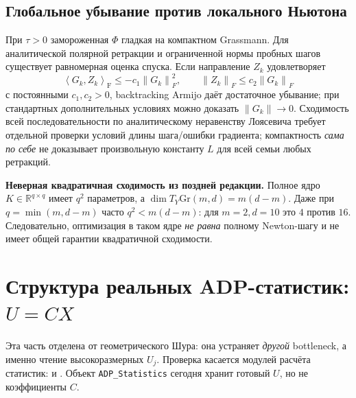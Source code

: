 \documentclass[10.5pt,a4paper]{article}
\newcommand{\R}{\mathbb{R}}
\newcommand{\Gr}{\mathrm{Gr}}
\newcommand{\norm}[1]{\left\|#1\right\|}
\newcommand{\inn}[2]{\left\langle #1,#2\right\rangle_{\mathrm F}}
\numberwithin{equation}{section}
\theoremstyle{plain}
\theoremstyle{definition}
\begin{document}
\subsection{Глобальное убывание против локального Ньютона}
При $\tau>0$ замороженная $\Phi$ гладкая на компактном Grassmann. Для аналитической полярной ретракции и ограниченной нормы пробных шагов существует равномерная оценка спуска. Если направление $Z_k$ удовлетворяет
\begin{equation}
 \inn{G_k}{Z_k}\le-c_1\norm{G_k}_F^2,
 \qquad \norm{Z_k}_F\le c_2\norm{G_k}_F
 \label{eq:gradrelated}
\end{equation}
с постоянными $c_1,c_2>0$, backtracking Armijo даёт достаточное убывание; при стандартных дополнительных условиях можно доказать $\norm{G_k}\to0$. Сходимость всей последовательности по аналитическому неравенству Лоясевича требует отдельной проверки условий длины шага/ошибки градиента; компактность \emph{сама по себе} не доказывает произвольную константу $L$ для всей семьи любых ретракций.

\begin{auditbox}
\textbf{Неверная квадратичная сходимость из поздней редакции.} Полное ядро $K\in\R^{q\times q}$ имеет $q^2$ параметров, а $\dim T_Y\Gr(m,d)=m(d-m)$. Даже при $q=\min(m,d-m)$ часто $q^2<m(d-m)$: для $m=2,d=10$ это $4$ против $16$. Следовательно, оптимизация в таком ядре \emph{не равна} полному Newton-шагу и не имеет общей гарантии квадратичной сходимости.
\end{auditbox}

\section{Структура реальных ADP-статистик: $U=CX$}
Эта часть отделена от геометрического Шура: она устраняет \emph{другой} bottleneck, а именно чтение высокоразмерных $U_j$. Проверка касается модулей расчёта статистик:  и . Объект \texttt{ADP\_Statistics} сегодня хранит готовый $U$, но не коэффициенты $C$.
\end{document}
